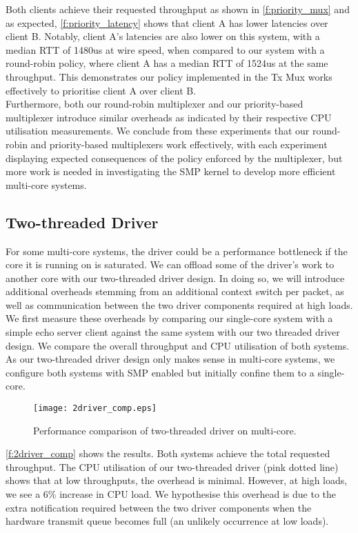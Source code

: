 Both clients achieve their requested throughput as shown in \autoref{f:priority_mux} and as expected, \autoref{f:priority_latency} shows
that client A has lower latencies over client B. Notably, client A's latencies are also lower on this system, with a median RTT
of 1480us at wire speed, when compared to our system with a round-robin policy, where client A has a median RTT of 1524us at the same
throughput. This demonstrates our policy implemented in the Tx Mux works effectively to prioritise
client A over client B.\\
Furthermore, both our round-robin multiplexer and our priority-based multiplexer introduce similar overheads as indicated by their 
respective CPU utilisation measurements. We conclude from these experiments that our round-robin and priority-based multiplexers work
effectively, with each experiment displaying expected consequences of the policy enforced by the multiplexer, but more work is needed in
investigating the SMP kernel to develop more efficient multi-core systems.\\

\subsection{Two-threaded Driver}
For some multi-core systems, the driver could be a performance bottleneck if the core it is running on is saturated. We can offload
some of the driver's work to another core with our two-threaded driver design. In doing so, we will introduce additional overheads
stemming from an additional context switch per packet, as well as communication between the two driver components required at
high loads. We first measure these overheads by comparing our single-core system with a simple echo server client against the 
same system with our two threaded driver design. We compare the overall throughput and CPU utilisation of both systems. As 
our two-threaded driver design only makes sense in multi-core systems, we configure both systems with SMP enabled but 
initially confine them to a single-core.

\begin{figure}[h]
    \centering
    \texttt{[image: 2driver\_comp.eps]}
    \caption{Performance comparison of two-threaded driver on multi-core.}
    \label{f:2driver_comp}
\end{figure}

\autoref{f:2driver_comp} shows the results. Both systems achieve the total requested throughput. The CPU utilisation of our 
two-threaded driver (pink dotted line) shows that at low throughputs, the overhead is minimal. However, at high loads, we
see a 6\% increase in CPU load. We hypothesise this overhead is due to the extra notification required between the two 
driver components when the hardware transmit queue becomes full (an unlikely occurrence at low loads).\\


